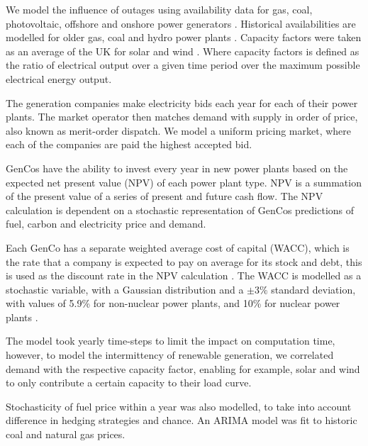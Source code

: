 We model the influence of outages using availability data for gas, coal, photovoltaic, offshore and onshore power generators \cite{Ltd2016, Hunt2015, carroll-j}. Historical availabilities are modelled for older gas, coal and hydro power plants \cite{AlbertaSystemElectricOperator2016}. Capacity factors were taken as an average of the UK for solar and wind \cite{Pfenninger2016, Staffell2016}. Where capacity factors is defined as the ratio of electrical output over a given time period over the maximum possible electrical energy output. 

The generation companies make electricity bids each year for each of their power plants. The market operator then matches demand with supply in order of price, also known as merit-order dispatch. We model a uniform pricing market, where each of the companies are paid the highest accepted bid.

GenCos have the ability to invest every year in new power plants based on the expected net present value (NPV) of each power plant type. NPV is a summation of the present value of a series of present and future cash flow. The NPV calculation is dependent on a stochastic representation of GenCos predictions of fuel, carbon and electricity price and demand.

Each GenCo has a separate weighted average cost of capital (WACC), which is the rate that a company is expected to pay on average for its stock and debt, this is used as the discount rate in the NPV calculation \cite{KincheloeStephenC1990TWAC}. The WACC is modelled as a stochastic variable, with a Gaussian distribution and a $\pm3\%$ standard deviation, with values of 5.9\% for non-nuclear power plants, and 10\% for nuclear power plants \cite{KPMG2017, Paper2012}. 

The model took yearly time-steps to limit the impact on computation time, however, to model the intermittency of renewable generation, we correlated demand with the respective capacity factor, enabling for example, solar and wind to only contribute a certain capacity to their load curve.

Stochasticity of fuel price within a year was also modelled, to take into account difference in hedging strategies and chance. An ARIMA model \cite{ARIMA} was fit to historic coal and natural gas prices.



